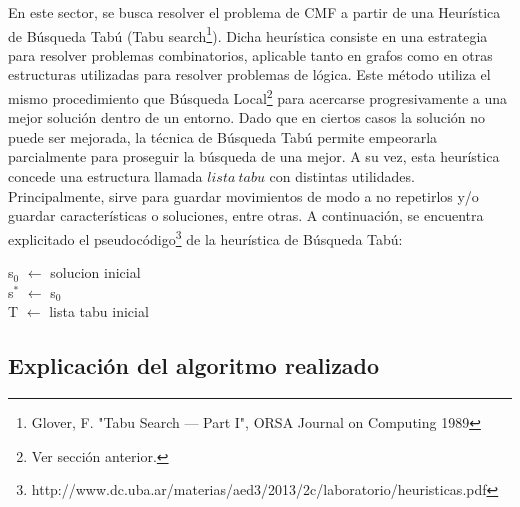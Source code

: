 En este sector, se busca resolver el problema de CMF a partir de una Heurística de Búsqueda Tabú (Tabu search\footnote{Glover, F. "Tabu Search — Part I", ORSA Journal on Computing 1989}). Dicha heurística consiste en una estrategia para resolver problemas combinatorios, aplicable tanto en grafos como en otras estructuras utilizadas para resolver problemas de lógica. Este método utiliza el mismo procedimiento que Búsqueda Local\footnote{Ver sección anterior.} para acercarse progresivamente a una mejor solución dentro de un entorno. Dado que en ciertos casos la solución no puede ser mejorada, la técnica de Búsqueda Tabú permite empeorarla parcialmente para proseguir la búsqueda de una mejor. A su vez, esta heurística concede una estructura llamada $lista\ tabu$ con distintas utilidades. Principalmente, sirve para guardar movimientos de modo a no repetirlos y/o guardar características o soluciones, entre otras. A continuación, se encuentra explicitado el pseudocódigo\footnote{http://www.dc.uba.ar/materias/aed3/2013/2c/laboratorio/heuristicas.pdf} de la heurística de Búsqueda Tabú:

\begin{algorithm}[H]
\SetAlgoLined
s$_{0}$ $\leftarrow$ solucion inicial \\
s$^{*}$ $\leftarrow$ s$_{0}$ \\
T $\leftarrow$ lista tabu inicial \\
\end{algorithm}

\subsection{Explicación del algoritmo realizado}

